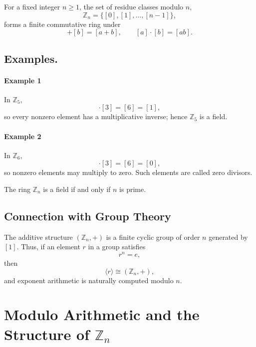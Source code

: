\documentclass[a4paper,12pt]{article}
\theoremstyle{definition}
\begin{document}
For a fixed integer $n \geq 1$, the set of residue classes modulo $n$,
\begin{equation*}
\mathbb{Z}_n = \{[0],[1],\dots,[n-1]\},
\end{equation*}
forms a finite commutative ring under
\begin{equation*}
[a]+[b]=[a+b], \qquad [a]\cdot[b]=[ab].
\end{equation*}

\subsection{Examples.}

\paragraph{Example 1}
In $\mathbb{Z}_5$,
\begin{equation*}
[2]\cdot[3] = [6] = [1],
\end{equation*}
so every nonzero element has a multiplicative inverse; hence $\mathbb{Z}_5$ is a field.
\paragraph{Example 2}
In $\mathbb{Z}_6$,
\begin{equation*}
[2]\cdot[3] = [6] = [0],
\end{equation*}
so nonzero elements may multiply to zero. Such elements are called zero divisors.

\begin{myquote}[red]
    The ring $\mathbb{Z}_n$ is a field if and only if $n$ is prime.
\end{myquote}

\subsection{Connection with Group Theory}

The additive structure $(\mathbb{Z}_n,+)$ is a finite cyclic group of order $n$ generated by $[1]$. Thus, if an element $r$ in a group satisfies
\begin{equation*}
r^n = e,
\end{equation*}
then
\begin{equation*}
\langle r \rangle \cong (\mathbb{Z}_n,+),
\end{equation*}
and exponent arithmetic is naturally computed modulo $n$.

\section{Modulo Arithmetic and the Structure of \texorpdfstring{$\mathbb{Z}_n$}{Z_n}}
\end{document}
